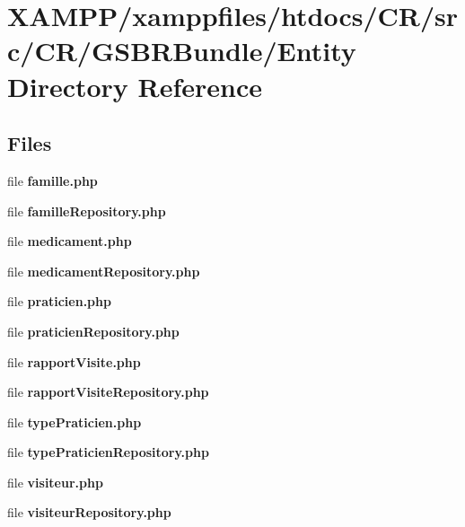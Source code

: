 \section{X\+A\+M\+P\+P/xamppfiles/htdocs/\+C\+R/src/\+C\+R/\+G\+S\+B\+R\+Bundle/\+Entity Directory Reference}
\label{dir_c90fb0d14c6c7819ff64774dca30e201}
\subsection*{Files}
\begin{DoxyCompactItemize}
\item 
file {\bfseries famille.\+php}
\item 
file {\bfseries famille\+Repository.\+php}
\item 
file {\bfseries medicament.\+php}
\item 
file {\bfseries medicament\+Repository.\+php}
\item 
file {\bfseries praticien.\+php}
\item 
file {\bfseries praticien\+Repository.\+php}
\item 
file {\bfseries rapport\+Visite.\+php}
\item 
file {\bfseries rapport\+Visite\+Repository.\+php}
\item 
file {\bfseries type\+Praticien.\+php}
\item 
file {\bfseries type\+Praticien\+Repository.\+php}
\item 
file {\bfseries visiteur.\+php}
\item 
file {\bfseries visiteur\+Repository.\+php}
\end{DoxyCompactItemize}
